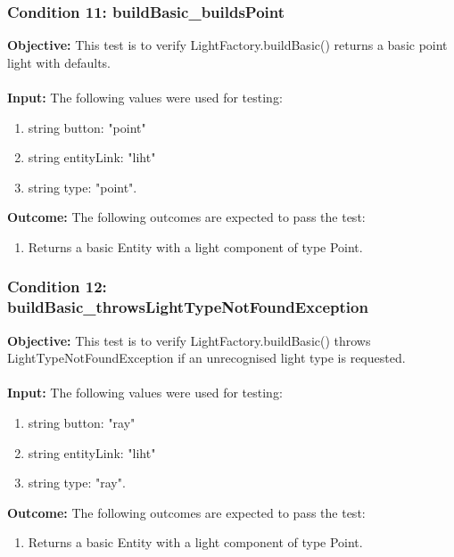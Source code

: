 \documentclass[a4paper,12pt]{article}
\begin{document}
		\subsubsection{Condition 11: buildBasic\_buildsPoint}
			\textbf{Objective:} This test is to verify  LightFactory.buildBasic() returns a basic point light with defaults.\\\\
			\textbf{Input:} The following values were used for testing:
				\begin{enumerate}
					\item string button: "point"
					\item string entityLink: "liht"
					\item string type: "point".
				\end{enumerate}
			\textbf{Outcome:} The following outcomes are expected to pass the test:
				\begin{enumerate}
					\item Returns a basic Entity with a light component of type Point.
				\end{enumerate}
		\subsubsection{Condition 12: buildBasic\_throwsLightTypeNotFoundException}
			\textbf{Objective:} This test is to verify  LightFactory.buildBasic() throws LightTypeNotFoundException if an unrecognised light type is requested.\\\\
			\textbf{Input:} The following values were used for testing:
				\begin{enumerate}
					\item string button: "ray"
					\item string entityLink: "liht"
					\item string type: "ray".
				\end{enumerate}
			\textbf{Outcome:} The following outcomes are expected to pass the test:
				\begin{enumerate}
					\item Returns a basic Entity with a light component of type Point.
				\end{enumerate}
\end{document}
